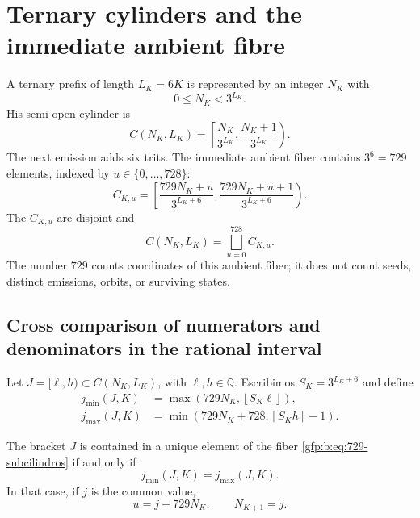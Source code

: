 \section{Ternary cylinders and the immediate ambient fibre}

A ternary prefix of length \(L_K=6K\) is represented by an integer
\(N_K\) with
\[
 0\leq N_K<3^{L_K}.
\]
His semi-open cylinder is
\begin{equation}
 C(N_K,L_K)=
 \left[
 \frac{N_K}{3^{L_K}},
 \frac{N_K+1}{3^{L_K}}
 \right).
 \label{gfp:b:eq:cilindro-nivel-K}
\end{equation}
The next emission adds six trits. The immediate ambient fiber contains
\(3^6=729\) elements, indexed by \(u\in\{0,\ldots,728\}\):
\begin{equation}
 C_{K,u}=
 \left[
 \frac{729N_K+u}{3^{L_K+6}},
 \frac{729N_K+u+1}{3^{L_K+6}}
 \right).
 \label{gfp:b:eq:729-subcilindros}
\end{equation}
The \(C_{K,u}\) are disjoint and
\[
 C(N_K,L_K)=\bigsqcup_{u=0}^{728}C_{K,u}.
\]
The number \(729\) counts coordinates of this ambient fiber; it does not count
seeds, distinct emissions, orbits, or surviving states.

\subsection{Cross comparison of numerators and denominators in the rational interval}

Let \(J=[\ell,h)\subset C(N_K,L_K)\), with
\(\ell,h\in\mathbb Q\). Escribimos \(S_K=3^{L_K+6}\) and define
\begin{align}
 j_{\min}(J,K)
 &=\max\!\left(729N_K,\left\lfloor S_K\ell\right\rfloor\right),
 \label{gfp:b:eq:jmin-diagonal}\\
 j_{\max}(J,K)
 &=\min\!\left(729N_K+728,\left\lceil S_Kh\right\rceil-1\right).
 \label{gfp:b:eq:jmax-diagonal}
\end{align}

\begin{lemma}
\label{gfp:b:lem:criterio-localizacion-unitaria}
The bracket \(J\) is contained in a unique element of the fiber
\eqref{gfp:b:eq:729-subcilindros} if and only if
\begin{equation}
 \boxed{j_{\min}(J,K)=j_{\max}(J,K).}
 \label{gfp:b:eq:jmin-igual-jmax}
\end{equation}
In that case, if \(j\) is the common value,
\[
 u=j-729N_K,
 \qquad
 N_{K+1}=j.
\]
\end{lemma}

